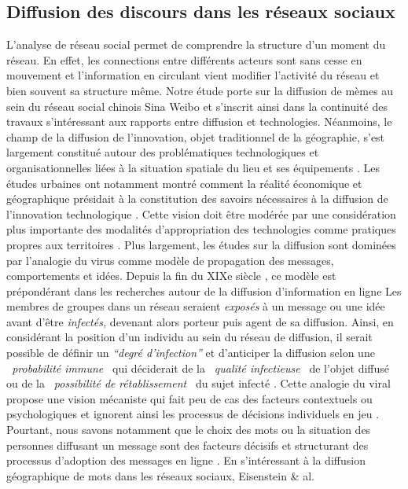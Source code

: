 

\subsection[Diffusion des discours dans les réseaux sociaux]{Diffusion des discours dans les réseaux sociaux}

L{\textquoteright}analyse de réseau social permet de comprendre la structure d{\textquoteright}un moment du réseau. En effet, les connections entre différents acteurs sont sans cesse en mouvement et l{\textquoteright}information en circulant vient modifier l{\textquoteright}activité du réseau et bien souvent sa structure m\^eme. Notre étude porte sur la diffusion de mèmes au sein du réseau social chinois Sina Weibo et s{\textquoteright}inscrit ainsi dans la continuité des travaux s{\textquoteright}intéressant aux rapports entre diffusion et technologies. Néanmoins, le champ de la diffusion de l{\textquoteright}innovation, objet traditionnel de la géographie, s{\textquoteright}est largement constitué autour des problématiques technologiques et organisationnelles liées à la situation spatiale du lieu et ses équipements \citep{Crevoisier2004}. Les études urbaines ont notamment montré comment la réalité économique et géographique présidait à la constitution des savoirs nécessaires à la diffusion de l{\textquoteright}innovation technologique \citep{Howells2002}. Cette vision doit \^etre modérée par une considération plus importante des modalités d{\textquoteright}appropriation des technologies comme pratiques propres aux territoires \citep{Fernandez2010}. Plus largement, les études sur la diffusion sont dominées par l{\textquoteright}analogie du virus comme modèle de propagation des messages, comportements et idées. Depuis la fin du XIXe siècle \citep{LeBon1895}, ce modèle est prépondérant dans les recherches autour de la diffusion d{\textquoteright}information en ligne \citep{Goel2012} Les membres de groupes dans un réseau seraient \textit{exposés }à un message ou une idée avant d{\textquoteright}\^etre \textit{infectés, }devenant alors porteur puis agent de sa diffusion. Ainsi, en considérant la position d{\textquoteright}un individu au sein du réseau de diffusion, il serait possible de définir un \textit{{\textquotedblleft}}\textit{degré d{\textquoteright}infection{\textquotedblright}} \citep{Cheng2013} et d{\textquoteright}anticiper la diffusion selon une \textit{{\guillemotleft}~probabilité immune~{\guillemotright} }qui\textit{ }déciderait de la \textit{{\guillemotleft}~qualité infectieuse~{\guillemotright} }de l{\textquoteright}objet diffusé ou de la \textit{{\guillemotleft}~possibilité de }\textit{rétablissement~{\guillemotright} }du sujet infecté \citep{Wang2011}. Cette analogie du viral propose une vision mécaniste qui fait peu de cas des facteurs contextuels ou psychologiques et ignorent ainsi les processus de décisions individuels en jeu \citep{Jackson2010}. Pourtant, nous savons notamment que le choix des mots ou la situation des personnes diffusant un message sont des facteurs décisifs et structurant des processus d{\textquoteright}adoption des messages en ligne \citep{Conover2013}.  En s{\textquoteright}intéressant à la diffusion géographique de mots dans les réseaux sociaux, Eisenstein \& al. 